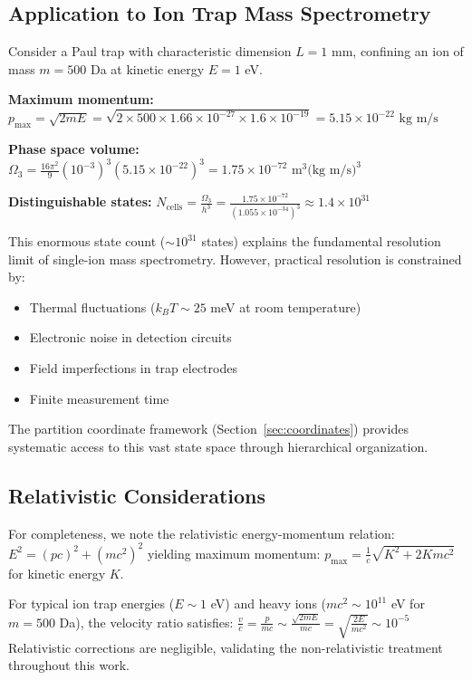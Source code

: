\subsection{Application to Ion Trap Mass Spectrometry}

\begin{example}
\label{ex:paul-trap}
Consider a Paul trap with characteristic dimension $L = 1$ mm, confining an ion of mass $m = 500$ Da at kinetic energy $E = 1$ eV.

\textbf{Maximum momentum:}
$
p_{\max} = \sqrt{2mE} = \sqrt{2 \times 500 \times 1.66 \times 10^{-27} \times 1.6 \times 10^{-19}} = 5.15 \times 10^{-22} \text{ kg m/s}
$

\textbf{Phase space volume:}
$
\Omega_3 = \frac{16\pi^2}{9} (10^{-3})^3 (5.15 \times 10^{-22})^3 = 1.75 \times 10^{-72} \text{ m}^3\text{(kg m/s)}^3
$

\textbf{Distinguishable states:}
$
N_{\mathrm{cells}} = \frac{\Omega_3}{h^3} = \frac{1.75 \times 10^{-72}}{(1.055 \times 10^{-34})^3} \approx 1.4 \times 10^{31}
$
\end{example}

This enormous state count ($\sim 10^{31}$ states) explains the fundamental resolution limit of single-ion mass spectrometry. However, practical resolution is constrained by:
\begin{itemize}
    \item Thermal fluctuations ($k_BT \sim 25$ meV at room temperature)
    \item Electronic noise in detection circuits
    \item Field imperfections in trap electrodes
    \item Finite measurement time
\end{itemize}

The partition coordinate framework (Section~\ref{sec:coordinates}) provides systematic access to this vast state space through hierarchical organization.



\subsection{Relativistic Considerations}

For completeness, we note the relativistic energy-momentum relation:
$
E^2 = (pc)^2 + (mc^2)^2
$
yielding maximum momentum:
$
p_{\max} = \frac{1}{c}\sqrt{K^2 + 2Kmc^2}
$
for kinetic energy $K$.

\begin{remark}
For typical ion trap energies ($E \sim 1$ eV) and heavy ions ($mc^2 \sim 10^{11}$ eV for $m = 500$ Da), the velocity ratio satisfies:
$
\frac{v}{c} = \frac{p}{mc} \sim \frac{\sqrt{2mE}}{mc} = \sqrt{\frac{2E}{mc^2}} \sim 10^{-5}
$
Relativistic corrections are negligible, validating the non-relativistic treatment throughout this work.
\end{remark}

